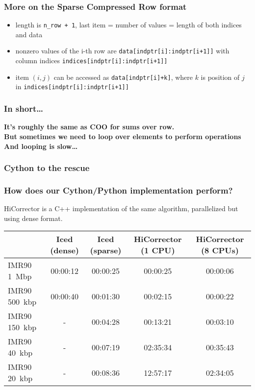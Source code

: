 \documentclass[xcolor=dvipsnames]{beamer}
\begin{document}
\begin{frame}
\frametitle{More on the Sparse Compressed Row format}
\begin{itemize}[label={$\bullet$}]
\item length is \texttt{n\_row + 1}, last item = number of values = length of both indices and data
\item nonzero values of the i-th row are \texttt{data[indptr[i]:indptr[i+1]]} with column indices \texttt{indices[indptr[i]:indptr[i+1]]}
\item item $(i, j)$ can be accessed as \texttt{data[indptr[i]+k]}, where $k$ is position of $j$ in \texttt{indices[indptr[i]:indptr[i+1]]}
\end{itemize}
\end{frame}


\begin{frame}
\frametitle{In short\dots}
{\Large \bf \color{Blue} It's roughly the same as COO for sums over row.}\\
\vspace{1em}
{\Large \bf \color{Blue} But sometimes we need to loop over
elements to perform operations}\\
\vspace{1em}
{\Large \bf \color{Blue} \flushleft And looping is slow\dots}
\end{frame}

\begin{frame}
\frametitle{Cython to the rescue}
\end{frame}


\begin{frame}
\frametitle{How does our Cython/Python implementation perform?}

{HiCorrector is a C++ implementation of the same algorithm, parallelized but using dense format.}

\vspace{2em}
\begin{table}
\scriptsize
\begin{tabular}{l | c | c | c | c }
  & {\bf Iced {\tiny (dense)}} & {\bf Iced {\tiny (sparse)}} & {\bf HiCorrector {\tiny (1 CPU)}} & {\bf HiCorrector {\tiny (8 CPUs)}} \\
\hline
IMR90 1~Mbp & 00:00:12 & 00:00:25 & 00:00:25 & 00:00:06 \\
IMR90 500~kbp & 00:00:40 & 00:01:30 & 00:02:15 & 00:00:22 \\
IMR90 150~kbp & - & 00:04:28 & 00:13:21 & 00:03:10 \\
IMR90 40~kbp & - & 00:07:19 & 02:35:34 & 00:35:43 \\
IMR90 20~kbp & - & 00:08:36 & 12:57:17 & 02:34:05 \\
\end{tabular}
\end{table}
\end{frame}
\end{document}
